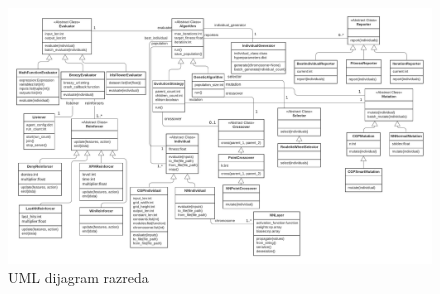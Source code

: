 \documentclass[times, utf8, zavrsni, numeric]{fer}
\begin{document}
\afterpage{\clearpage}
\begin{figure}
    \centering
    \includegraphics[width=\textwidth]{img/uml}
    \caption{UML dijagram razreda}\label{fig:uml}
\end{figure}
\end{document}

